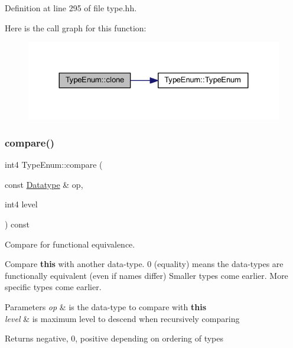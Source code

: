 Definition at line 295 of file type.\+hh.

Here is the call graph for this function\+:
\nopagebreak
\begin{figure}[H]
\begin{center}
\leavevmode
\includegraphics[width=324pt]{class_type_enum_ac5592c52de3d1ccad25cd9e1e20126d7_cgraph}
\end{center}
\end{figure}
\mbox{\label{class_type_enum_acf43c87e14ab5b8e128fb35d86059bc5}} 
\subsubsection{\texorpdfstring{compare()}{compare()}}
{\footnotesize\ttfamily int4 Type\+Enum\+::compare (\begin{DoxyParamCaption}\item[{const \mbox{\hyperlink{class_datatype}{Datatype}} \&}]{op,  }\item[{int4}]{level }\end{DoxyParamCaption}) const\hspace{0.3cm}{\ttfamily [virtual]}}



Compare for functional equivalence. 

Compare {\bfseries{this}} with another data-\/type. 0 (equality) means the data-\/types are functionally equivalent (even if names differ) Smaller types come earlier. More specific types come earlier. 
\begin{DoxyParams}{Parameters}
{\em op} & is the data-\/type to compare with {\bfseries{this}} \\
\hline
{\em level} & is maximum level to descend when recursively comparing \\
\hline
\end{DoxyParams}
\begin{DoxyReturn}{Returns}
negative, 0, positive depending on ordering of types 
\end{DoxyReturn}


